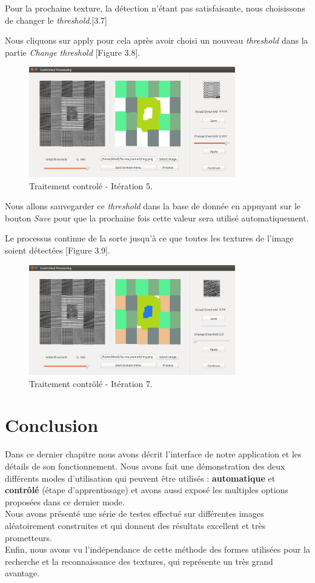 \indent Pour la prochaine texture, la détection n'étant pas satisfaisante, nous choisissons de changer le \textit{threshold}.[3.7]

Nous cliquons sur apply pour cela après avoir choisi un nouveau \textit{threshold} dans la partie \textit{Change threshold} [Figure 3.8].

\begin{figure}[H]
	\centering
		\includegraphics[width=9cm,]{Figures/chap3/Capture5010.png}
	\caption[traitementAutofin]{Traitement controlé - Itération 5.}
	\end{figure}

\indent Nous allons sauvegarder ce \textit{threshold} dans la base de donnée en appuyant sur le bouton \textit{Save} pour que la prochaine fois cette valeur sera utilisé automatiquement.

Le processus continue de la sorte jusqu’à ce que toutes les textures de l'image soient détectées [Figure 3.9].


\begin{figure}[H]
	\centering
		\includegraphics[width=9cm,]{Figures/chap3/Capture5253.png}
	\caption[traitementAutofin]{Traitement contrôlé - Itération 7.}
\end{figure}


\section{Conclusion}

\indent Dans ce dernier chapitre nous avons décrit l'interface de notre application et les détails de son fonctionnement. Nous avons fait une démonstration des deux différents modes d'utilisation qui peuvent être utilisés : \textbf{automatique} et \textbf{contrôlé} (étape d'apprentissage) et avons aussi exposé les multiples options proposées dans ce dernier mode.\\
\indent Nous avons présenté une série de testes effectué sur différentes images aléatoirement construites et qui donnent des résultats excellent et très prometteurs.\\
\indent Enfin, nous avons vu l'indépendance de cette méthode des formes utilisées pour la recherche et la reconnaissance des textures, qui représente un très grand avantage.
